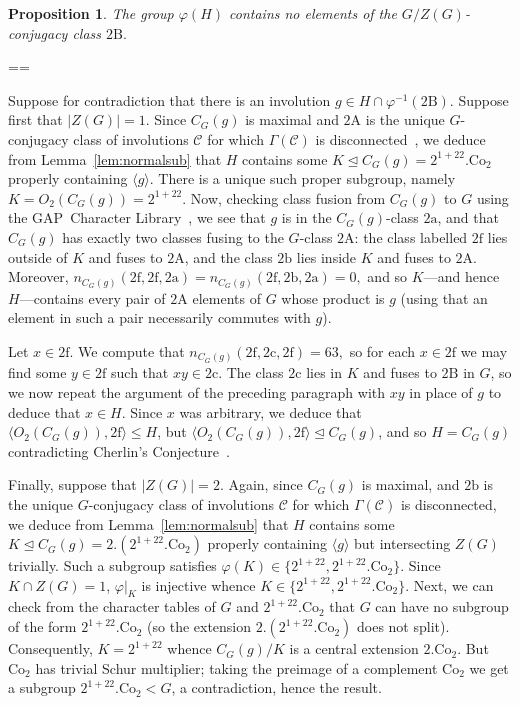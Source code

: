 \documentclass[11pt, a4paper]{amsart}
\makeatletter
\newcommand{\gap}{{\sf GAP}}
\newtheorem{prop}[thm]{Proposition}
\renewcommand{\proofname}{Proof}
\renewenvironment{proof}[1][\proofname]{\par
  \pushQED{\qed}  \normalfont \partopsep=\z@skip \topsep=\z@skip
  \trivlist
  \item[\hskip\labelsep
        \scshape
    #1\@addpunct{.}]\ignorespaces
}{  \popQED\endtrivlist\@endpefalse
}
\makeatother
\begin{document}
\begin{prop}\label{prop:Bno2B}
    The group $\varphi(H)$ contains no elements of the $G/Z(G)$-conjugacy class $\mathrm{2B}.$
\end{prop}

\begin{proof}
    Suppose for contradiction that there is an involution $g\in H\cap\varphi^{-1}(\mathrm{2B})$. Suppose first that $|Z(G)|=1$.  Since $C_G(g)$ is maximal and $\mathrm{2A}$ is the unique $G$-conjugacy class of involutions $\mathcal{C}$ for which $\Gamma(\mathcal{C})$ is disconnected~\cite[Propositions 3.1, 3.2, and 3.3]{CDP}, we deduce from Lemma~\ref{lem:normalsub} that $H$ contains some $K\trianglelefteq C_G(g)=2^{1+22}.\mathrm{Co}_2$ properly containing $\langle g\rangle$. There is a unique such proper subgroup, namely $K=O_2(C_G(g))=2^{1+22}$. Now, checking class fusion from $C_G(g)$ to $G$ using the \gap~Character Library~\cite{CTblLib1.3.11}, we see that $g$ is in the $C_G(g)$-class $\mathrm{2a}$, and that $C_G(g)$ has exactly two classes fusing to the $G$-class $\mathrm{2A}$: the class labelled $\mathrm{2f}$ lies outside of $K$ and fuses to $\mathrm{2A}$, and the class $\mathrm{2b}$ lies inside $K$ and fuses to $\mathrm{2A}$. Moreover, $n_{C_G(g)}(\mathrm{2f},\mathrm{2f},\mathrm{2a})=n_{C_G(g)}(\mathrm{2f},\mathrm{2b},\mathrm{2a})=0,$ and so $K$---and hence $H$---contains every pair of $\mathrm{2A}$ elements of $G$ whose product is $g$ (using that an element in such a pair necessarily commutes with $g$).

    Let $x\in\mathrm{2f}$. We compute that $n_{C_G(g)}(\mathrm{2f},\mathrm{2c},\mathrm{2f})=63,$ so for each $x\in\mathrm{2f}$ we may find some $y\in\mathrm{2f}$ such that $xy\in\mathrm{2c}$. The class $\mathrm{2c}$ lies in $K$ and fuses to $\mathrm{2B}$ in $G$, so we now repeat the argument of the preceding paragraph with $xy$ in place of $g$ to deduce that $x\in H$. Since $x$ was arbitrary, we deduce that $\langle O_2(C_G(g)),\mathrm{2f}\rangle\leq H$, but $\langle O_2(C_G(g)),\mathrm{2f}\rangle\trianglelefteq C_G(g)$, and so $H=C_G(g)$ contradicting Cherlin's Conjecture~\cite{GLS22}.
    
    Finally, suppose that $|Z(G)|=2$. Again, since $C_G(g)$ is maximal, and $\mathrm{2b}$ is the unique $G$-conjugacy class of involutions $\mathcal{C}$ for which $\Gamma(\mathcal{C})$ is disconnected, we deduce from Lemma~\ref{lem:normalsub} that $H$ contains some $K\trianglelefteq C_G(g)=2.(2^{1+22}.\mathrm{Co}_2)$ properly containing $\langle g\rangle$ but intersecting $Z(G)$ trivially. Such a subgroup satisfies $\varphi(K)\in\{2^{1+22},2^{1+22}.\mathrm{Co}_2\}$. Since $K\cap Z(G)=1$, $\varphi|_K$ is injective whence $K\in\{2^{1+22},2^{1+22}.\mathrm{Co}_2\}$.
    Next, we can check from the character tables of $G$ and $2^{1+22}.\mathrm{Co}_2$ that $G$ can have no subgroup of the form $2^{1+22}.\mathrm{Co}_2$ (so the extension $2.(2^{1+22}.\mathrm{Co}_2)$ does not split). Consequently, $K=2^{1+22}$ whence $C_G(g)/K$ is a central extension $2.\mathrm{Co}_2$. But $\mathrm{Co}_2$ has trivial Schur multiplier; taking the preimage of a complement $\mathrm{Co}_2$ we get a subgroup $2^{1+22}.\mathrm{Co}_2< G$, a contradiction, hence the result.
\end{proof}
\end{document}
